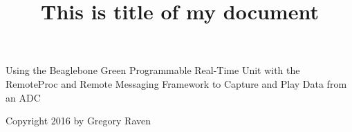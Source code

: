 \documentclass[oneside,letterpaper,12pt]{book}
\title{This is title of my document}
\begin{document}




%
\frontmatter
Using the Beaglebone Green Programmable Real-Time Unit with the RemoteProc and Remote Messaging Framework to Capture and Play Data from an ADC

Copyright 2016 by Gregory Raven
\tableofcontents
\listoftables
\listoffigures

\mainmatter














\backmatter
\end{document}
